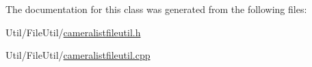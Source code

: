 The documentation for this class was generated from the following files\-:\begin{DoxyCompactItemize}
\item 
Util/\-File\-Util/\hyperlink{cameralistfileutil_8h}{cameralistfileutil.\-h}\item 
Util/\-File\-Util/\hyperlink{cameralistfileutil_8cpp}{cameralistfileutil.\-cpp}\end{DoxyCompactItemize}
